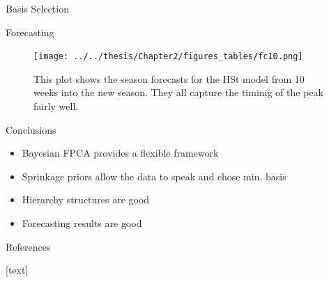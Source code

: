 \documentclass[final]{beamer}
\newlength{\onecolwid}
\begin{document}
\begin{frame}[t]
\begin{columns}[t]
\begin{column}{\onecolwid}
\begin{block}{Basis Selection}

\end{block}

\vspace{-20mm}

\begin{block}{Forecasting}
\begin{figure}
\texttt{[image: ../../thesis/Chapter2/figures\_tables/fc10.png]}
\caption{This plot shows the season forecasts for the HSt model from 10 weeks into the new season. They all capture the timinig of the peak fairly well.}
\end{figure}
\end{block}

\vspace{-20mm}


\begin{block}{Conclusions}

\begin{itemize}
\item Bayesian FPCA provides a flexible framework \\
\item Sprinkage priors allow the data to speak and chose min. basis\\
\item Hierarchy structures are good \\
\item Forecasting results are good \\
\end{itemize}

\end{block}


\begin{block}{References}

[text]
\nocite{*}



\end{block}




\end{column} %

\end{columns} %

\end{frame} %
\end{document}
